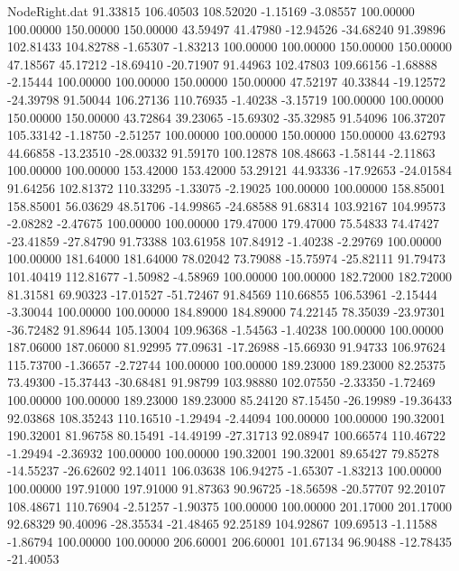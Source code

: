 \begin{filecontents}{NodeRight.dat}
  91.33815  106.40503  108.52020    -1.15169   -3.08557  100.00000  100.00000  150.00000  150.00000   43.59497   41.47980  -12.94526  -34.68240
  91.39896  102.81433  104.82788    -1.65307   -1.83213  100.00000  100.00000  150.00000  150.00000   47.18567   45.17212  -18.69410  -20.71907
  91.44963  102.47803  109.66156    -1.68888   -2.15444  100.00000  100.00000  150.00000  150.00000   47.52197   40.33844  -19.12572  -24.39798
  91.50044  106.27136  110.76935    -1.40238   -3.15719  100.00000  100.00000  150.00000  150.00000   43.72864   39.23065  -15.69302  -35.32985
  91.54096  106.37207  105.33142    -1.18750   -2.51257  100.00000  100.00000  150.00000  150.00000   43.62793   44.66858  -13.23510  -28.00332
  91.59170  100.12878  108.48663    -1.58144   -2.11863  100.00000  100.00000  153.42000  153.42000   53.29121   44.93336  -17.92653  -24.01584
  91.64256  102.81372  110.33295    -1.33075   -2.19025  100.00000  100.00000  158.85001  158.85001   56.03629   48.51706  -14.99865  -24.68588
  91.68314  103.92167  104.99573    -2.08282   -2.47675  100.00000  100.00000  179.47000  179.47000   75.54833   74.47427  -23.41859  -27.84790
  91.73388  103.61958  107.84912    -1.40238   -2.29769  100.00000  100.00000  181.64000  181.64000   78.02042   73.79088  -15.75974  -25.82111
  91.79473  101.40419  112.81677    -1.50982   -4.58969  100.00000  100.00000  182.72000  182.72000   81.31581   69.90323  -17.01527  -51.72467
  91.84569  110.66855  106.53961    -2.15444   -3.30044  100.00000  100.00000  184.89000  184.89000   74.22145   78.35039  -23.97301  -36.72482
  91.89644  105.13004  109.96368    -1.54563   -1.40238  100.00000  100.00000  187.06000  187.06000   81.92995   77.09631  -17.26988  -15.66930
  91.94733  106.97624  115.73700    -1.36657   -2.72744  100.00000  100.00000  189.23000  189.23000   82.25375   73.49300  -15.37443  -30.68481
  91.98799  103.98880  102.07550    -2.33350   -1.72469  100.00000  100.00000  189.23000  189.23000   85.24120   87.15450  -26.19989  -19.36433
  92.03868  108.35243  110.16510    -1.29494   -2.44094  100.00000  100.00000  190.32001  190.32001   81.96758   80.15491  -14.49199  -27.31713
  92.08947  100.66574  110.46722    -1.29494   -2.36932  100.00000  100.00000  190.32001  190.32001   89.65427   79.85278  -14.55237  -26.62602
  92.14011  106.03638  106.94275    -1.65307   -1.83213  100.00000  100.00000  197.91000  197.91000   91.87363   90.96725  -18.56598  -20.57707
  92.20107  108.48671  110.76904    -2.51257   -1.90375  100.00000  100.00000  201.17000  201.17000   92.68329   90.40096  -28.35534  -21.48465
  92.25189  104.92867  109.69513    -1.11588   -1.86794  100.00000  100.00000  206.60001  206.60001  101.67134   96.90488  -12.78435  -21.40053

\end{filecontents}
